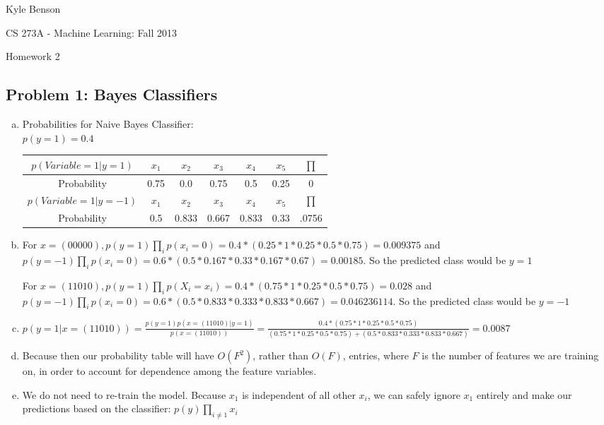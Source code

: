 \documentclass[twoside,11pt]{article}
\theoremstyle{definition}
\begin{document}
\centerline{\Large Kyle Benson}
\centerline{CS 273A - Machine Learning: Fall 2013}
\centerline{Homework 2}

\subsection*{Problem 1: Bayes Classifiers}

\begin{enumerate}[(a)]
\item Probabilities for Naive Bayes Classifier: \\
$p(y=1) = 0.4$ \\
\begin{tabular}{|c|c|c|c|c|c|c|}\hline
$p(Variable = 1 | y = 1)$ & $x_1$ & $x_2$ & $x_3$ & $x_4$ & $x_5$ & $\prod$ \\
\hline
Probability & 0.75 & 0.0 & 0.75 & 0.5 & 0.25 & 0 \\
\hline
$p(Variable = 1 | y = -1)$ & $x_1$ & $x_2$ & $x_3$ & $x_4$ & $x_5$ & $\prod$ \\
\hline
Probability & 0.5 & 0.833 & 0.667 & 0.833 & 0.33 & .0756\\
\hline
\end{tabular}

\item For $x=(00000), p(y=1)\prod\limits_{i}p(x_i=0) = 0.4 * (0.25*1*0.25*0.5*0.75) = 0.009375$
and $p(y=-1)\prod\limits_{i}p(x_i=0) = 0.6 * (0.5*0.167*0.33*0.167*0.67) = 0.00185$.
So the predicted class would be $y=1$ 

For $x=(11010), p(y=1)\prod\limits_{i}p(X_i=x_i) = 0.4 * (0.75 * 1 * 0.25 * 0.5 * 0.75) = 0.028$
and $p(y=-1)\prod\limits_{i}p(x_i=0) = 0.6 * (0.5 * 0.833 * 0.333 * 0.833 * 0.667) = 0.046236114$.
So the predicted class would be $y=-1$

\item $p(y=1 | x = (1 1 0 1 0)) = 
\frac{p(y=1)p(x=(1 1 0 1 0) | y=1)}{p(x=(1 1 0 1 0))} =
\frac{0.4 * (0.75 * 1 * 0.25 * 0.5 * 0.75)}
{(0.75 * 1 * 0.25 * 0.5 * 0.75) + (0.5 * 0.833 * 0.333 * 0.833 * 0.667)}
= 0.0087
$

\item Because then our probability table will have $O(F^2)$, rather than $O(F)$, entries, where $F$ is the number of features we are training on,
in order to account for dependence among the feature variables.

\item We do not need to re-train the model.  Because $x_1$ is independent of all other $x_i$, we can safely ignore $x_1$ entirely and make our predictions based on the classifier: $p(y)\prod\limits_{i\neq1}x_i$
\end{enumerate}
\end{document}
